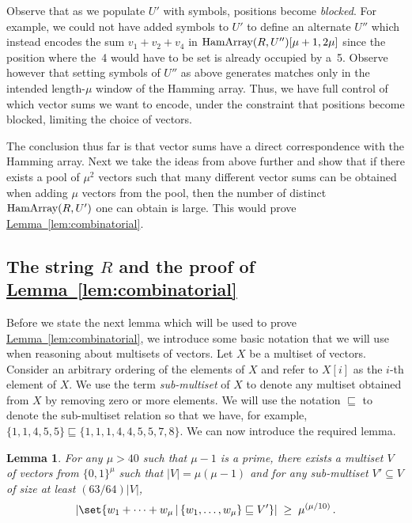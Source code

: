 \documentclass[11pt]{article}
\numberwithin{equation}{section}
\newtheorem{lemma}[theorem]{Lemma}
\theoremstyle{definition}
\theoremstyle{plain}
\newcommand{\expref}[2]{\hyperref[#2]{#1~\ref{#2}}}
\newcommand{\Hamarray}{\ensuremath{\textup{HamArray}}}
\newcommand{\ELL}{\ensuremath{\mu}}
\begin{document}
Observe that as we populate $U'$ with symbols, positions become \emph{blocked}. For example, we could not have added symbols to $U'$ to define an alternate $U''$ which instead encodes the sum $v_1+v_2+v_4$ in $\Hamarray(R,U'')[\mu+1,2\mu]$ since the position where the~4 would have to be set is already occupied by a~5.
Observe however that setting symbols of $U''$ as above generates matches only in the intended
%
length-$\mu$  %
window of the Hamming array. Thus, we have full control of which vector sums we want to encode, under the constraint that positions become blocked, limiting the choice of vectors.

The conclusion thus far is that vector sums have a direct correspondence with the Hamming array. Next we take the ideas from above further and show that if there exists a pool of $\mu^2$ vectors such that many different vector sums can be obtained when adding $\mu$ vectors from the pool, then the number of distinct $\Hamarray(R,U')$ one can obtain is large. This would prove \expref{Lemma}{lem:combinatorial}.


\subsection{The string \texorpdfstring{$R$}{R} and the proof of \expref{Lemma}{lem:combinatorial}} \label{sec:R}

Before we state the next lemma which will be used to prove \expref{Lemma}{lem:combinatorial},  we introduce some basic notation that we will use when reasoning about multisets of vectors. Let $X$ be a multiset of vectors. Consider an arbitrary ordering of the elements of $X$ and refer to $X[i]$ as the $i$-th element of $X$.  
We use the term \emph{sub-multiset} of $X$ to denote any multiset obtained from $X$ by removing zero or more elements. We will use the notation $\sqsubseteq$ to denote the sub-multiset relation so that we have, for example,  $\{1,1,4,5,5\} \sqsubseteq \{1,1,1,4,4,5,5,7,8\}$. We can now introduce the required lemma.

\begin{lemma}
	\label{lem:vecsum}
	For any $\ELL>40$ such that $\ELL-1$ is a prime, there exists a multiset $V$ of vectors from
	$\{0,1\}^\ELL$ such that $|V|=\ELL(\ELL-1)$ and for any sub-multiset $V'\subseteq V$ of size at least
	$(63/64)|V|$,
	\begin{align*}
	\left|\set{w_1 + \cdots + w_\ELL \,|\, \{w_1,\dots,w_\ELL\} \sqsubseteq V'}\right| \;\geq\; \ELL^{(\ELL/10)}\,.
	\end{align*}
\end{lemma}
\end{document}
